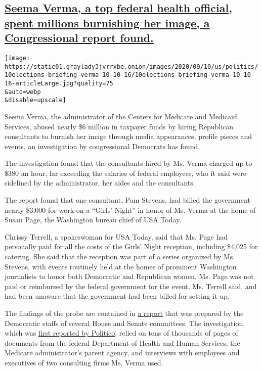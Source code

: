 \hypertarget{seema-verma-a-top-federal-health-official-spent-millions-burnishing-her-image-a-congressional-report-found}{%
\subsection{\texorpdfstring{\protect\hyperlink{seema-verma-a-top-federal-health-official-spent-millions-burnishing-her-image-a-congressional-report-found}{Seema
Verma, a top federal health official, spent millions burnishing her
image, a Congressional report
found.}}{Seema Verma, a top federal health official, spent millions burnishing her image, a Congressional report found.}}\label{seema-verma-a-top-federal-health-official-spent-millions-burnishing-her-image-a-congressional-report-found}}

\texttt{[image: https://static01.graylady3jvrrxbe.onion/images/2020/09/10/us/politics/10elections-briefing-verma-10-10-16/10elections-briefing-verma-10-10-16-articleLarge.jpg?quality=75\\\&auto=webp\\\&disable=upscale]}

Seema Verma, the administrator of the Centers for Medicare and Medicaid
Services, abused nearly \$6 million in taxpayer funds by hiring
Republican consultants to burnish her image through media appearances,
profile pieces and events, an investigation by congressional Democrats
has found.

The investigation found that the consultants hired by Ms. Verma charged
up to \$380 an hour, far exceeding the salaries of federal employees,
who it said were sidelined by the administrator, her aides and the
consultants.

The report found that one consultant, Pam Stevens, had billed the
government nearly \$3,000 for work on a ``Girls' Night'' in honor of Ms.
Verma at the home of Susan Page, the Washington bureau chief of USA
Today.

Chrissy Terrell, a spokeswoman for USA Today, said that Ms. Page had
personally paid for all the costs of the Girls' Night reception,
including \$4,025 for catering. She said that the reception was part of
a series organized by Ms. Stevens, with events routinely held at the
homes of prominent Washington journalists to honor both Democratic and
Republican women. Ms. Page was not paid or reimbursed by the federal
government for the event, Ms. Terrell said, and had been unaware that
the government had been billed for setting it up.

The findings of the probe are contained in
\href{https://drive.google.com/file/d/1nezMXLk6auFtFn4bzLy26k0P5CVI1Zow/view}{a
report} that was prepared by the Democratic staffs of several House and
Senate committees. The investigation, which was
\href{https://www.politico.com/news/2020/09/10/seema-verma-medicaid-expenses-411539}{first
reported by Politico}, relied on tens of thousands of pages of documents
from the federal Department of Health and Human Services, the Medicare
administrator's parent agency, and interviews with employees and
executives of two consulting firms Ms. Verma used.

